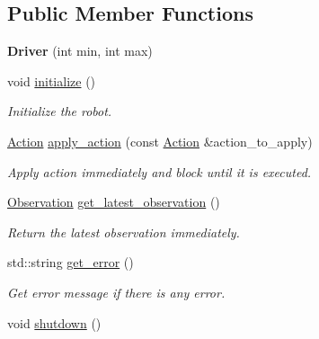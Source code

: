 \subsection*{Public Member Functions}
\begin{DoxyCompactItemize}
\item 
{\bfseries Driver} (int min, int max)\hypertarget{classDriver_a440406bbabc606d80051e93b44b1bd2e}{}\label{classDriver_a440406bbabc606d80051e93b44b1bd2e}

\item 
void \hyperlink{classDriver_a81c0beb523fad80cd40cfcc6a6e3de2d}{initialize} ()
\begin{DoxyCompactList}\small\item\em Initialize the robot. \end{DoxyCompactList}\item 
\hyperlink{classAction}{Action} \hyperlink{classDriver_a0f8d51bef151ccc38a0cb7b226048e28}{apply\+\_\+action} (const \hyperlink{classAction}{Action} \&action\+\_\+to\+\_\+apply)
\begin{DoxyCompactList}\small\item\em Apply action immediately and block until it is executed. \end{DoxyCompactList}\item 
\hyperlink{classObservation}{Observation} \hyperlink{classDriver_afb09663997bffc5c694fb5aa8aca243a}{get\+\_\+latest\+\_\+observation} ()
\begin{DoxyCompactList}\small\item\em Return the latest observation immediately. \end{DoxyCompactList}\item 
std\+::string \hyperlink{classDriver_a6fb739b87c892c4102e838508855c0be}{get\+\_\+error} ()
\begin{DoxyCompactList}\small\item\em Get error message if there is any error. \end{DoxyCompactList}\item 
void \hyperlink{classDriver_a630fc9183eb419beb09b5828b4547b6d}{shutdown} ()\hypertarget{classDriver_a630fc9183eb419beb09b5828b4547b6d}{}\label{classDriver_a630fc9183eb419beb09b5828b4547b6d}


\end{DoxyCompactItemize}
